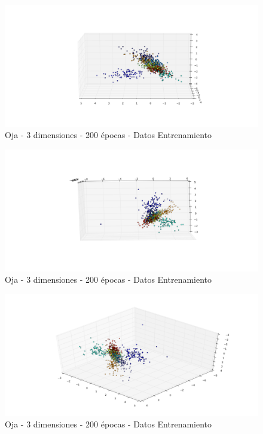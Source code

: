\begin{figure}[h]
  \begin{center}
    \includegraphics[scale=0.4]{../img/ej1/oja/alt-oja_3salida_200ep_train_2.png}
  \caption{Oja - 3 dimensiones - 200 épocas - Datos Entrenamiento}
  \end{center}
\end{figure}

\begin{figure}[h]
  \begin{center}
    \includegraphics[scale=0.4]{../img/ej1/oja/alt-oja_3salida_200ep_train_3.png}
  \caption{Oja - 3 dimensiones - 200 épocas - Datos Entrenamiento}
  \end{center}
\end{figure}

\begin{figure}[h]
  \begin{center}
    \includegraphics[scale=0.4]{../img/ej1/oja/alt-oja_3salida_200ep_train_4.png}
  \caption{Oja - 3 dimensiones - 200 épocas - Datos Entrenamiento}
  \end{center}
\end{figure}

